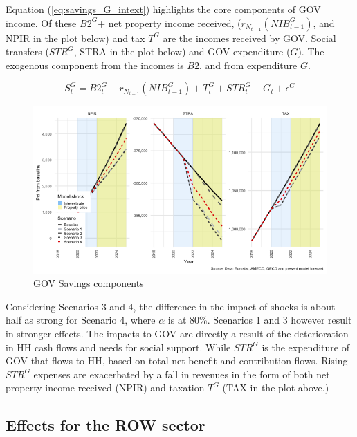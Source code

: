 \documentclass[
]{book}
\begin{document}
Equation (\ref{eq:savings_G_intext}) highlights the core components of GOV income. Of these \(B2^G\)+ net property income received, (\(r_{N_{t-1}}(NIB^G_{t-1})\), and NPIR in the plot below) and tax \(T^G\) are the incomes received by GOV. Social transfers (\(STR^G\), STRA in the plot below) and GOV expenditure (\(G\)). The exogenous component from the incomes is \(B2\), and from expenditure \(G\).

\begin{equation}
S^G_t= B2^G_t + r_{N_{t-1}}(NIB^G_{t-1}) + T^G_t+ STR^G_t - G_t + \epsilon ^G
\label{eq:savings_G_intext}
\end{equation}

\begin{figure}[H]
\includegraphics[width=0.95\linewidth]{figures/fl-fi-sfc-plot-GOV-indicators-savings-1} \caption{GOV Savings components}\label{fig:fl-fi-sfc-plot-GOV-indicators-savings}
\end{figure}

Considering Scenarios 3 and 4, the difference in the impact of shocks is about half as strong for Scenario 4, where \(\alpha\) is at 80\%. Scenarios 1 and 3 however result in stronger effects. The impacts to GOV are directly a result of the deterioration in HH cash flows and needs for social support. While \(STR^G\) is the expenditure of GOV that flows to HH, based on total net benefit and contribution flows. Rising \(STR^G\) expenses are exacerbated by a fall in revenues in the form of both net property income received (NPIR) and taxation \(T^G\) (TAX in the plot above.)

\hypertarget{effects-for-the-row-sector}{%
\subsection{Effects for the ROW sector}\label{effects-for-the-row-sector}}
\end{document}
